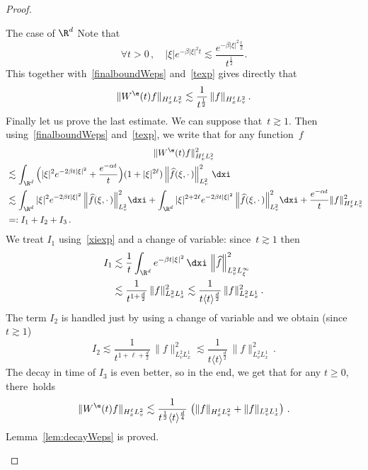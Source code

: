 \begin{proof}
\begin{laststep}{The case of $\R^d$} 
Note that
\begin{equation}\label{xiexp}
\forall t>0 \,, \quad |\xi| e^{-\beta |\xi|^2t} \lesssim \frac{e^{-\beta |\xi|^2\frac{t}{2}}}{t^\frac12}.
\end{equation}
This together with~\eqref{finalboundWeps} and~\eqref{texp} gives directly that
\[
\|W^\e(t) f\|_{H^\ell_xL^2_v} \lesssim \frac{1}{t^\frac12 } \, \|f\|_{H^\ell_xL^2_v}\,.
\]
Finally let us prove the last estimate. We can suppose that~$t \gtrsim 1$. Then using~\eqref{finalboundWeps} and~\eqref{texp}, we write that for any function~$f$
\begin{multline*}
\|W^\e(t) f\|^2_{H^\ell_xL^2_v} \\
\begin{aligned}
&\lesssim \int_{\R^d} \Big(|\xi|^2 e^{-2\beta t |\xi|^2} + \frac{e^{-\alpha t}}{t}\Big)(1+|\xi|^{2\ell}) \left\|\widehat f (\xi, \cdot\,)\right\|^2_{L^2_v} \, \dxi \\
&\lesssim \int_{\R^d} |\xi|^2 e^{-2\beta t |\xi|^2}\left\|\widehat f (\xi, \cdot\,)\right\|^2_{L^2_v} \! \dxi + \int_{\R^d} |\xi|^{2+2\ell} e^{-2\beta t |\xi|^2}\left\|\widehat f (\xi, \cdot\,)\right\|^2_{L^2_v} \! \dxi + \frac{e^{-\alpha t}}{t} \|f\|^2_{H^\ell_xL^2_v}\!\\
& =: I_1+I_2+I_3\,.
\end{aligned}
\end{multline*}
We treat $I_1$ using~\eqref{xiexp} and a change of variable: since~$t \gtrsim 1$ then
\begin{align*}
I_1 &\lesssim \frac{1}{t} \int_{\R^d} e^{-\beta t |\xi|^2} \, \dxi \, \left\|\widehat f \right\|^2_{L^2_v L^\infty_\xi} \\
&\lesssim \frac{1}{t^{1+\frac d2}} \, \|f\|^2_{L^2_vL^1_x} \lesssim \frac{1}{{t\langle t \rangle^{\frac d2}}} \, \|f\|^2_{L^2_vL^1_x}\,.
\end{align*}
The term $I_2$ is handled just by using a change of variable and we obtain (since~$t \gtrsim 1$)
\[
I_2 \lesssim \frac{1}{t^{1+\ell+\frac d2}} \, \|f\|^2_{L^2_vL^1_x} \lesssim \frac{1}{{t\langle t \rangle^{\frac d2}}} \, \|f\|^2_{L^2_vL^1_x}\,.
\]
The decay in time of $I_3$ is even better, so in the end, we get that for any $t \ge 0$, there~holds
\[
\|W^\e(t) f\|_{H^\ell_xL^2_v} \lesssim \frac{1}{{t^\frac12\langle t \rangle^{\frac d4}}} \, \left(\|f\|_{H^\ell_xL^2_v} +\|f\|_{L^2_vL^1_x}\right)\,.
\]
Lemma~\ref{lem:decayWeps} is proved.
\end{laststep}
\let\qed\relax
\end{proof}


